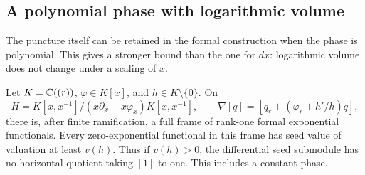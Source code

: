 \subsection{A polynomial phase with logarithmic volume}\label{sec:puncturedpoly}

The puncture itself can be retained in the formal construction when
the phase is polynomial. This gives a stronger bound than the one for
$dx$: logarithmic volume does not change under a scaling of $x$.

\begin{theorem}\label{thm:puncturedpoly}
Let $K=\mathbb C((r))$, $\varphi\in K[x]$, and $h\in K\setminus\{0\}$.
On
\[
 H=K[x,x^{-1}]/(x\partial_x+x\varphi_x)K[x,x^{-1}],\qquad
 \nabla[q]=[q_r+(\varphi_r+h'/h)q],
\]
there is, after finite ramification, a full frame of rank-one formal
exponential functionals. Every zero-exponential functional in this
frame has seed value of valuation at least $v(h)$. Thus if $v(h)>0$,
the differential seed submodule has no horizontal quotient taking
$[1]$ to one. This includes a constant phase.
\end{theorem}
